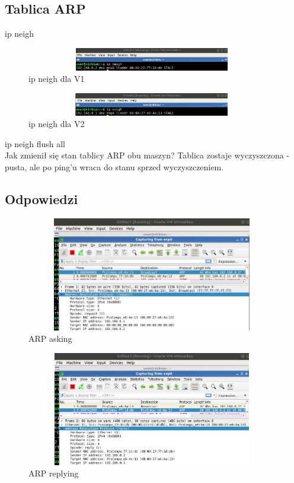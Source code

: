\documentclass{article}
\begin{document}
\subsection{Tablica ARP}
\tabto{0.8cm}    ip neigh
\begin{figure}[!htb]
\centering
\includegraphics[width=11cm,height=1cm]{neighv1.png}
\caption{ip neigh dla V1}
\end{figure}
\begin{figure}[!htb]
\centering
\includegraphics[width=11cm,height=1cm]{neighv2.png}
\caption{ip neigh dla V2}
\end{figure}
\tabto{0.8cm}    ip neigh flush all
\\
\tabto{0.4cm}Jak zmienił się stan tablicy ARP obu maszyn?
\tabto{0.8cm}Tablica zostaje wyczyszczona - pusta, ale po ping'u wraca do stanu sprzed wyczyszczeniem.
\subsection{Odpowiedzi}

\begin{figure}[!htb]
\centering
\includegraphics[width=11cm,height=5cm]{arpask.png}
\caption{ARP asking}
\end{figure}
\begin{figure}[!htb]
\centering
\includegraphics[width=11cm,height=5cm]{arprep.png}
\caption{ARP replying}
\end{figure}
\end{document}
